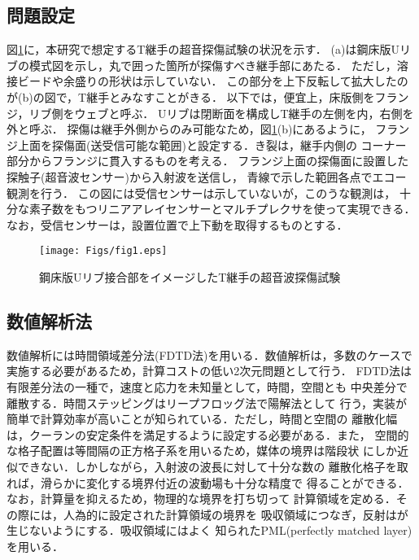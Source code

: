 \documentclass{jsce}
\begin{document}
\subsection{問題設定}
図\ref{fig:fig1}に，本研究で想定するT継手の超音探傷試験の状況を示す．
(a)は鋼床版Uリブの模式図を示し，丸で囲った箇所が探傷すべき継手部にあたる．
ただし，溶接ビードや余盛りの形状は示していない．
この部分を上下反転して拡大したのが(b)の図で，T継手とみなすことがきる．
以下では，便宜上，床版側をフランジ，リブ側をウェブと呼ぶ．
Uリブは閉断面を構成しT継手の左側を内，右側を外と呼ぶ．
探傷は継手外側からのみ可能なため，図\ref{fig:fig1}(b)にあるように，
フランジ上面を探傷面(送受信可能な範囲)と設定する．き裂は，継手内側の
コーナー部分からフランジに貫入するものを考える．
フランジ上面の探傷面に設置した探触子(超音波センサー)から入射波を送信し，
青線で示した範囲各点でエコー観測を行う．
この図には受信センサーは示していないが，このうな観測は，
十分な素子数をもつリニアアレイセンサーとマルチプレクサを使って実現できる．
なお，受信センサーは，設置位置で上下動を取得するものとする．
\begin{figure}[h]
	\begin{center}
	\texttt{[image: Figs/fig1.eps]} 
	\end{center}
	\caption{
		鋼床版Uリブ接合部をイメージしたT継手の超音波探傷試験
	} 
	\label{fig:fig1}
\end{figure}
\subsection{数値解析法}
数値解析には時間領域差分法(FDTD法)を用いる．数値解析は，多数のケースで
実施する必要があるため，計算コストの低い2次元問題として行う．
FDTD法は有限差分法の一種で，速度と応力を未知量として，時間，空間とも
中央差分で離散する．時間ステッピングはリープフロッグ法で陽解法として
行う，実装が簡単で計算効率が高いことが知られている．ただし，時間と空間の
離散化幅は，クーランの安定条件を満足するように設定する必要がある．また，
空間的な格子配置は等間隔の正方格子系を用いるため，媒体の境界は階段状
にしか近似できない．しかしながら，入射波の波長に対して十分な数の
離散化格子を取れば，滑らかに変化する境界付近の波動場も十分な精度で
得ることができる．なお，計算量を抑えるため，物理的な境界を打ち切って
計算領域を定める．その際には，人為的に設定された計算領域の境界を
吸収領域につなぎ，反射はが生じないようにする．吸収領域にはよく
知られたPML(perfectly matched layer)を用いる．
\end{document}
